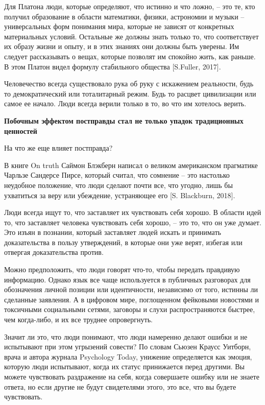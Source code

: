 Для Платона люди, которые определяют, что истинно и что ложно, – это те, кто получил образование в области математики, физики, астрономии и музыки – универсальных форм понимания мира, которые не зависят от конкретных материальных условий. Остальные же должны знать только то, что соответствует их образу жизни и опыту, и в этих знаниях они должны быть уверены. Им следует рассказывать о вещах, которые позволят им спокойно жить, как раньше. В этом Платон видел формулу стабильного общества [S.Fuller, 2017].

Человечество всегда существовало рука об руку с искажением реальности, будь то демократический или тоталитарный режим. Будь то расцвет цивилизации или самое ее начало. Люди всегда верили только в то, во что им хотелось верить.

\textbf{Побочным эффектом постправды стал не только упадок традиционных ценностей}

На что же еще влияет постправда?

В книге On truth Саймон Блэкберн написал о великом американском прагматике Чарльзе Сандерсе Пирсе, который считал, что сомнение – это настолько неудобное положение, что люди сделают почти все, что угодно, лишь бы ухватиться за веру или убеждение, устраняющее его [S. Blackburn, 2018].

Люди всегда ищут то, что заставляет их чувствовать себя хорошо. В области идей то, что заставляет человека чувствовать себя хорошо, – это то, что он уже думает. Это изъян в познании, который заставляет людей искать и принимать доказательства в пользу утверждений, в которые они уже верят, избегая или отвергая доказательства против.

Можно предположить, что люди говорят что-то, чтобы передать правдивую информацию. Однако язык все чаще используется в публичных разговорах для обозначения личной позиции или идентичности, независимо от того, истинны ли сделанные заявления. А в цифровом мире, поглощенном фейковыми новостями и токсичными социальными сетями, заговоры и слухи распространяются быстрее, чем когда-либо, и их все труднее опровергнуть.

Значит ли это, что люди понимают, что люди намеренно делают ошибки и не испытывают при этом угрызений совести? По словам Сьюзен Краусс Уитборн, врача и автора журнала Psychology Today, унижение определяется как эмоция, которую люди испытывают, когда их статус принижается перед другими. Вы можете чувствовать раздражение на себя, когда совершаете ошибку или не знаете ответа, но если другие не будут свидетелями этого, это все, что вы будете чувствовать.

